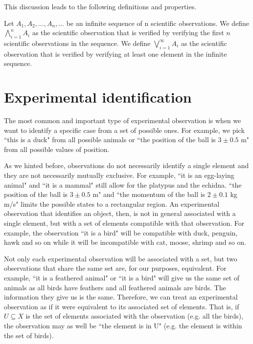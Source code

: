 \documentclass[11pt,letterpaper,fleqn]{memoir} %
\begin{document}
This discussion leads to the following definitions and properties.

\begin{defn}
	Let $A_1, A_2, ... , A_n, ...$ be an infinite sequence of n scientific observations. We define $\bigwedge\limits_{i=1}^{n} A_i$ as the scientific observation that is verified by verifying the first $n$ scientific observations in the sequence. We define $\bigvee\limits_{i=1}^{\infty} A_i$ as the scientific observation that is verified by verifying at least one element in the infinite sequence.
\end{defn}

\section{Experimental identification}

The most common and important type of experimental observation is when we want to identify a specific case from a set of possible ones. For example, we pick ``this is a duck" from all possible animals or ``the position of the ball is $3 \pm 0.5$ m" from all possible values of position.

As we hinted before, observations do not necessarily identify a single element and they are not necessarily mutually exclusive. For example, ``it is an egg-laying animal" and ``it is a mammal" still allow for the platypus and the echidna. ``the position of the ball is $3 \pm 0.5$ m" and ``the momentum of the ball is $2 \pm 0.1$ kg m/s" limits the possible states to a rectangular region. An experimental observation that identifies an object, then, is not in general associated with a single element, but with a set of elements compatible with that observation. For example, the observation ``it is a bird" will be compatible with duck, penguin, hawk and so on while it will be incompatible with cat, moose, shrimp and so on.

Not only each experimental observation will be associated with a set, but two observations that share the same set are, for our purposes, equivalent. For example, ``it is a feathered animal" or ``it is a bird" will give us the same set of animals as all birds have feathers and all feathered animals are birds. The information they give us is the same. Therefore, we can treat an experimental observation as if it were equivalent to its associated set of elements. That is, if $U \subseteq X$ is the set of elements associated with the observation (e.g. all the birds), the observation may as well be ``the element is in U" (e.g. the element is within the set of birds).
\end{document}

